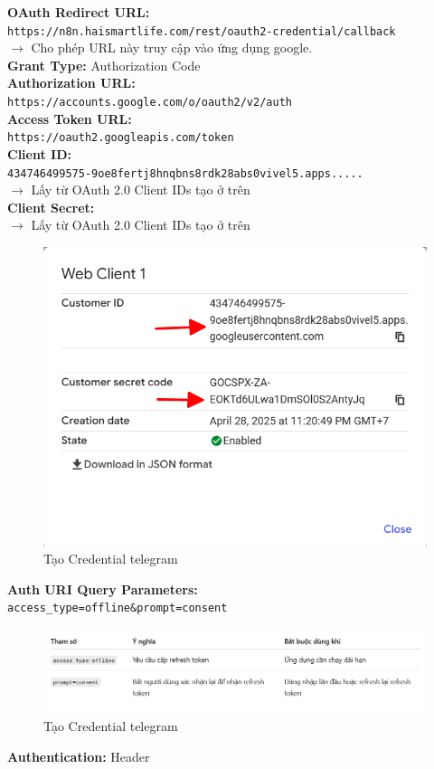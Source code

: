 \textbf{OAuth Redirect URL:} \\
\texttt{https://n8n.haismartlife.com/rest/oauth2-credential/callback}\\
$\longrightarrow$ Cho phép URL này truy cập vào ứng dụng google.\\
\textbf{Grant Type:} Authorization Code\\
\textbf{Authorization URL:}\\
\texttt{https://accounts.google.com/o/oauth2/v2/auth}\\
\textbf{Access Token URL:}\\
\texttt{https://oauth2.googleapis.com/token}\\
\textbf{Client ID:} \\
\verb|434746499575-9oe8fertj8hnqbns8rdk28abs0vivel5.apps.....|\\
$\longrightarrow$ Lấy từ OAuth 2.0 Client IDs tạo ở trên\\
\textbf{Client Secret:}\\
$\longrightarrow$ Lấy từ OAuth 2.0 Client IDs tạo ở trên
    \begin{figure}[H]
    \centering
    \includegraphics[width=1\textwidth]{images/3thuchi12.png}
    \caption{Tạo Credential telegram}
    \end{figure}
\textbf{Auth URI Query Parameters:}\\
\verb|access_type=offline&prompt=consent|
    \begin{figure}[H]
    \centering
    \includegraphics[width=1\textwidth]{images/3thuchi15.png}
    \caption{Tạo Credential telegram}
    \end{figure}
\textbf{Authentication:} Header\\




